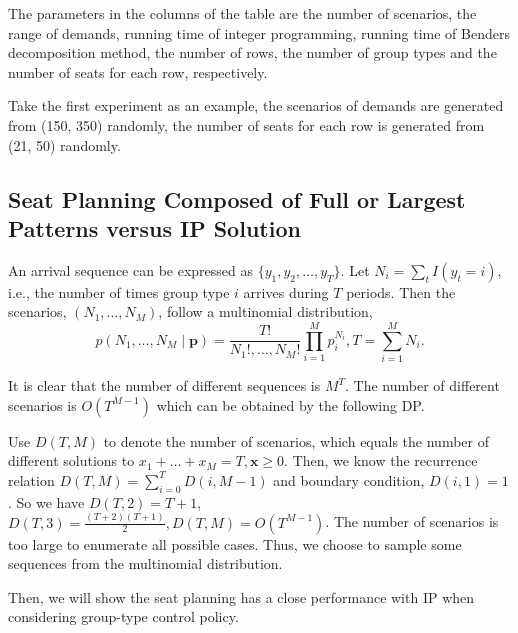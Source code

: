 The parameters in the columns of the table are the number of scenarios, the range of demands, running time of integer programming, running time of Benders decomposition method, the number of rows, the number of group types and the number of seats for each row, respectively. 

Take the first experiment as an example, the scenarios of demands are generated from (150, 350) randomly, the number of seats for each row is generated from (21, 50) randomly.



\subsection{Seat Planning Composed of Full or Largest Patterns versus IP Solution}
An arrival sequence can be expressed as $\{y_{1}, y_{2}, \ldots, y_{T}\}$. Let $N_{i} = \sum_{t} I(y_t = i)$, i.e., the number of times group type $i$ arrives during $T$ periods. Then the scenarios, $(N_1, \ldots, N_{M})$, follow a multinomial distribution, $$p\left(N_1, \ldots, N_{M} \mid \mathbf{p}\right)=\frac{T !}{N_{1}!, \ldots, N_{M}!} \prod_{i=1}^{M} p_{i}^{N_i}, T = \sum_{i=1}^{M} N_{i}.$$

It is clear that the number of different sequences is $M^{T}$. The number of different scenarios is $O(T^{M-1})$ which can be obtained by the following DP.

Use $D(T, M) $ to denote the number of scenarios, which equals the number of different solutions to $x_{1}+\ldots + x_{M} = T, \mathbf{x} \geq 0$. Then, we know the recurrence relation $D(T, M) = \sum_{i= 0}^{T} D(i, M-1)$ and boundary condition, $D(i,1) = 1$. So we have $D(T,2) = T+1$, $D(T,3) = \frac{(T+2)(T+1)}{2}, D(T,M) = O(T^{M-1})$. The number of scenarios is too large to enumerate all possible cases. Thus, we choose to sample some sequences from the multinomial distribution.

Then, we will show the seat planning has a close performance with IP when considering group-type control policy.

